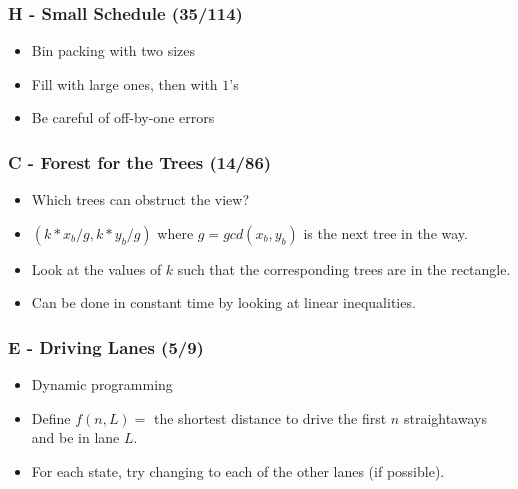 \documentclass{beamer}
\begin{document}
\begin{frame}
\frametitle{H - Small Schedule (35/114)}
\begin{itemize}
\setlength\itemsep{0.5\baselineskip}
\item Bin packing with two sizes
\item Fill with large ones, then with $1$'s
\item Be careful of off-by-one errors
\end{itemize}
\end{frame}

\begin{frame}
\frametitle{C - Forest for the Trees (14/86)}
\begin{itemize}
\setlength\itemsep{0.5\baselineskip}
\item Which trees can obstruct the view?
\item $(k*x_b/g,k*y_b/g)$ where $g=gcd(x_b,y_b)$ is the next tree in the way.
\item Look at the values of $k$ such that the corresponding trees are in the rectangle.
\item Can be done in constant time by looking at linear inequalities.
\end{itemize}
\end{frame}


\begin{frame}
\frametitle{E - Driving Lanes (5/9)}
\begin{itemize}
\setlength\itemsep{0.5\baselineskip}
\item Dynamic programming
\item Define $f(n,L) = $ the shortest distance to drive the first $n$ straightaways and be in lane $L$.
\item For each state, try changing to each of the other lanes (if possible).
\end{itemize}
\end{frame}
\end{document}
